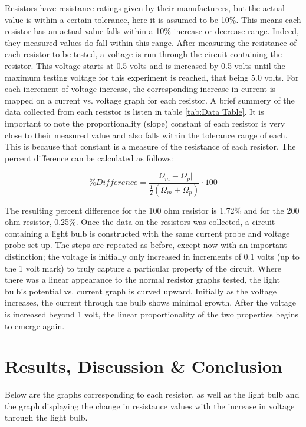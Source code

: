 \documentclass[12pt, letterpaper]{article}
\begin{document}
Resistors have resistance ratings given by their manufacturers, but the actual value is within a certain tolerance, here it is assumed to be 10\%. This means each resistor has an actual value falls within a 10\% increase or decrease range. Indeed, they measured values do fall within this range. After measuring the resistance of each resistor to be tested, a voltage is run through the circuit containing the resistor. This voltage starts at 0.5 volts and is increased by 0.5 volts until the maximum testing voltage for this experiment is reached, that being 5.0 volts. For each increment of voltage increase, the corresponding increase in current is mapped on a current vs. voltage graph for each resistor. A brief summery of the data collected from each resistor is listen in table \ref{tab:Data Table}. It is important to note the proportionality (slope) constant of each resistor is very close to their measured value and also falls within the tolerance range of each. This is because that constant is a measure of the resistance of each resistor. The percent difference can be calculated as follows:

\begin{equation}
    \% Difference = \frac{\lvert \Omega_m - \Omega_p \rvert}{\frac{1}{2}(\Omega_m + \Omega_p)} \cdot 100
\end{equation}

The resulting percent difference for the 100 ohm resistor is 1.72\% and for the 200 ohm resistor, 0.25\%. Once the data on the resistors was collected, a circuit containing a light bulb is constructed with the same current probe and voltage probe set-up. The steps are repeated as before, except now with an important distinction; the voltage is initially only increased in increments of 0.1 volts (up to the 1 volt mark) to truly capture a particular property of the circuit. Where there was a linear appearance to the normal resistor graphs tested, the light bulb’s potential vs. current graph is curved upward. Initially as the voltage increases, the current through the bulb shows minimal growth. After the voltage is increased beyond 1 volt, the linear proportionality of the two properties begins to emerge again.

\section{Results, Discussion \& Conclusion}

Below are the graphs corresponding to each resistor, as well as the light bulb and the graph displaying the change in resistance values with the increase in voltage through the light bulb.
\end{document}
